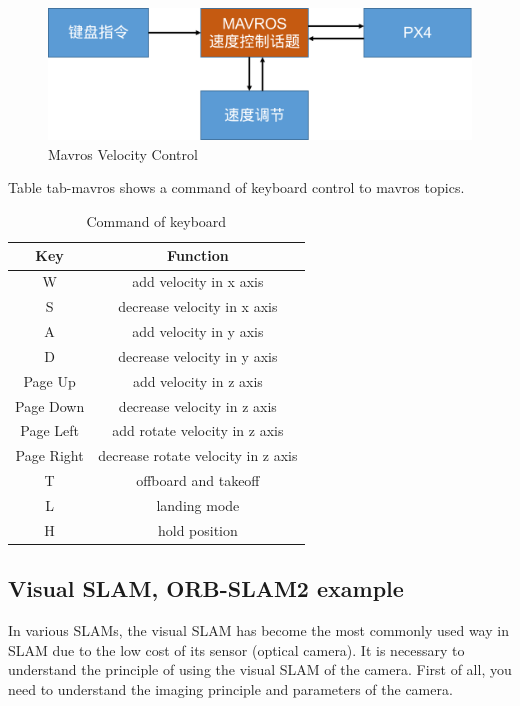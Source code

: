 \documentclass[conference]{IEEEtran}
\begin{document}
\begin{figure}[htbp]
    \centerline{\includegraphics[width=0.8\columnwidth]{keyboard.png}}
    \caption{Mavros Velocity Control}
\end{figure}

Table tab-mavros shows a command of keyboard control to mavros topics.

\begin{table}[htbp]
    \caption{Command of keyboard}
    \label{tab-mavros}
\begin{center}
    \begin{tabular}{cc}
        \hline
        Key& Function\\
        \hline
		W& add velocity in x axis\\
		S& decrease velocity in x axis\\
		A& add velocity in y axis\\
		D& decrease velocity in y axis\\
		
		Page Up    & add velocity in z axis\\
		Page Down  & decrease velocity in z axis\\
		Page Left  & add rotate velocity in z axis\\
		Page Right & decrease rotate velocity in z axis\\
		
		T & offboard and takeoff\\
		L & landing mode\\
		H & hold position\\
        \hline
    \end{tabular}
\end{center}
\end{table}

\subsection{Visual SLAM, ORB-SLAM2 example}

In various SLAMs, the visual SLAM has become the most commonly used way in SLAM due to the low cost of its sensor (optical camera). 
It is necessary to understand the principle of using the visual SLAM of the camera. 
First of all, you need to understand the imaging principle and parameters of the camera.
\end{document}
